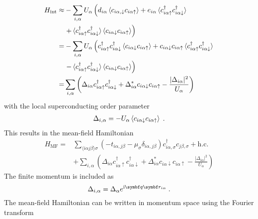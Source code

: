 \documentclass[../main.tex]{subfiles}
\begin{document}
\begin{align}
	H_{\mathrm{int}} \approx &-\sum_{i, \alpha} U_{\alpha} \left(
	d_{i \alpha} \braket{c_{i \alpha, \downarrow} c_{i \alpha \uparrow}}
	+ e_{i \alpha} \braket{c_{i \alpha \uparrow}^{\dagger} c_{i \alpha \downarrow}^{\dagger}} \right. \nonumber \\
	&\left.+ \braket{c_{i \alpha \uparrow}^{\dagger} c_{i \alpha \downarrow}^{\dagger}} \braket{c_{i \alpha \downarrow} c_{i \alpha \uparrow}}
	\right) \\
	= &-\sum_{i, \alpha} U_{\alpha} \left(
	c_{i \alpha \uparrow}^{\dagger} c_{i \alpha \downarrow}^{\dagger} \braket{c_{i \alpha \downarrow} c_{i \alpha \uparrow}}
	+ c_{i \alpha \downarrow} c_{i \alpha \uparrow} \braket{c_{i \alpha \uparrow}^{\dagger} c_{i \alpha \downarrow}^{\dagger}} \right. \nonumber \\
	&\left.- \braket{c_{i \alpha \uparrow}^{\dagger} c_{i \alpha \downarrow}^{\dagger}} \braket{c_{i \alpha \downarrow} c_{i \alpha \uparrow}} \right) \\
	= &\sum_{i, \alpha} \left(\Delta_{i \alpha} c_{i \alpha \uparrow}^{\dagger} c_{i \alpha \downarrow}^{\dagger} + \Delta_{i \alpha}^{*} c_{i \alpha \downarrow} c_{i \alpha \uparrow} - \frac{\vert \Delta_{i \alpha} \vert^2}{U_{\alpha}}\right)
\end{align}
with the local superconducting order parameter
\begin{align}
	\Delta_{i, \alpha} = -U_{\alpha} \braket{c_{i \alpha \downarrow} c_{i \alpha \uparrow}} \;.
\end{align}
This results in the mean-field Hamiltonian
\begin{align}
	H_{\mathrm{MF}} = &\sum_{\langle i \alpha j \beta \rangle \sigma} \left(-t_{i \alpha, j \beta} - \mu_{\sigma} \delta_{i \alpha, j \beta}\right) c_{i \alpha, \sigma}^{\dagger} c_{j \beta, \sigma} + \mathrm{h.c.} \nonumber \\
	&+ \sum_{i, \alpha} \left(\Delta_{i \alpha} c_{i \alpha \uparrow}^{\dagger} c_{i \alpha \downarrow}^{\dagger} + \Delta_{i \alpha}^{*} c_{i \alpha \downarrow} c_{i \alpha \uparrow} - \frac{\vert \Delta_{i \alpha} \vert^2}{U_{\alpha}}\right)
\end{align}
The finite momentum is included as
\begin{equation}
	\Delta_{i, \alpha} = \Delta_{\alpha} e^{\iu \vb{q} \vb{r}_{i \alpha}} \;.
\end{equation}
The mean-field Hamiltonian can be written in momentum space using the Fourier transform
\end{document}
